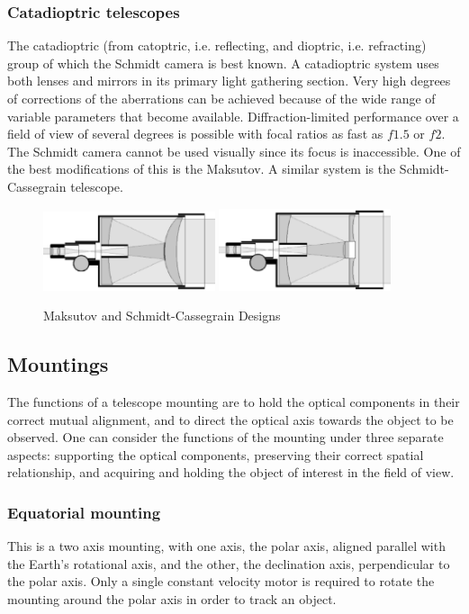 \subsubsection{Catadioptric telescopes}
The catadioptric (from catoptric, i.e. reflecting, and dioptric, i.e. 
refracting) group of which the Schmidt camera is best known. A catadioptric 
system uses both lenses and mirrors in its primary light gathering section.
Very high degrees of corrections of the aberrations can be achieved because
of the wide range of variable parameters that become available. Diffraction-limited
performance over a field of view of several degrees is possible with
focal ratios as fast as $f1.5$ or $f2$. The Schmidt
camera cannot be used visually since its focus is inaccessible. One of the best
modifications of this is the Maksutov. A similar system is the 
Schmidt-Cassegrain telescope. 
%
\begin{figure}[th!]
	\centering
	\includegraphics[width=0.45\textwidth]{maksutovcassegraindetailed.eps}
	\includegraphics[width=0.45\textwidth]{schmidtcassegraindetailed.eps}
  \caption{Maksutov and Schmidt-Cassegrain Designs}
  \label{fig:catadiotropic}
\end{figure}

\subsection{Mountings}
The functions of a telescope mounting are to hold the optical components 
in their correct mutual alignment, and to direct the optical axis towards the
object to be observed. One can consider the functions of the mounting under 
three separate aspects: supporting the optical components, preserving their 
correct spatial relationship, and acquiring and holding the object of interest 
in the field of view.

\subsubsection{Equatorial mounting}
This is a two axis mounting, with one axis, the polar axis,
aligned parallel with the Earth's rotational axis, and the other, the declination axis,
perpendicular to the polar axis. Only a single constant velocity motor is required 
to rotate the mounting around the polar axis in order to track an object.

